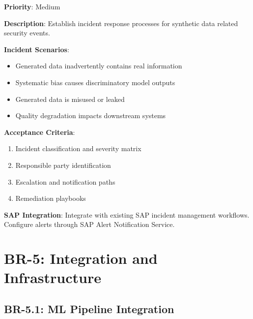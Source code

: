 \documentclass[12pt,a4paper,twoside]{report}
\begin{document}
\begin{tcolorbox}[colback=red!5,colframe=red!70,title=BR-4.5: Incident Response Process]
\textbf{Priority}: Medium

\textbf{Description}: Establish incident response processes for synthetic data
related security events.

\textbf{Incident Scenarios}:
\begin{itemize}
\item Generated data inadvertently contains real information
\item Systematic bias causes discriminatory model outputs
\item Generated data is misused or leaked
\item Quality degradation impacts downstream systems
\end{itemize}

\textbf{Acceptance Criteria}:
\begin{enumerate}
\item Incident classification and severity matrix
\item Responsible party identification
\item Escalation and notification paths
\item Remediation playbooks
\end{enumerate}

\textbf{SAP Integration}: Integrate with existing SAP incident management workflows.
Configure alerts through SAP Alert Notification Service.
\end{tcolorbox}


\section{BR-5: Integration and Infrastructure}

\subsection{BR-5.1: ML Pipeline Integration}
\end{document}
